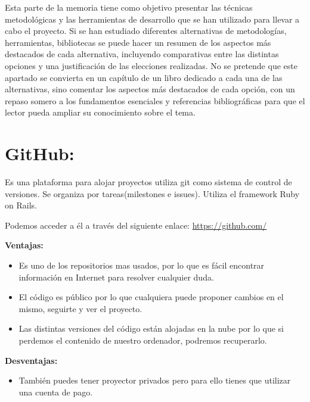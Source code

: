 
Esta parte de la memoria tiene como objetivo presentar las técnicas metodológicas y las herramientas de desarrollo que se han utilizado para llevar a cabo el proyecto. Si se han estudiado diferentes alternativas de metodologías, herramientas, bibliotecas se puede hacer un resumen de los aspectos más destacados de cada alternativa, incluyendo comparativas entre las distintas opciones y una justificación de las elecciones realizadas. 
No se pretende que este apartado se convierta en un capítulo de un libro dedicado a cada una de las alternativas, sino comentar los aspectos más destacados de cada opción, con un repaso somero a los fundamentos esenciales y referencias bibliográficas para que el lector pueda ampliar su conocimiento sobre el tema.


\section{GitHub:}
Es una plataforma para alojar proyectos utiliza git como sistema de control de versiones. Se organiza por tareas(milestones e issues).
Utiliza el framework Ruby on Rails.

Podemos acceder a él a través del siguiente enlace: 
\url{https://github.com/}

\textbf{Ventajas:}

\begin{itemize}
\item Es uno de los repositorios mas usados, por lo que es fácil encontrar información en Internet para resolver cualquier duda.

\item El código es público por lo que cualquiera puede proponer cambios en el mismo, seguirte y ver el proyecto.

\item Las distintas versiones del código están alojadas en la nube por lo que si perdemos el contenido de nuestro ordenador, podremos recuperarlo.
\end{itemize}

\textbf{Desventajas:}

\begin{itemize}
\item También puedes tener proyector privados pero para ello tienes que utilizar una cuenta de pago.
\end{itemize}


